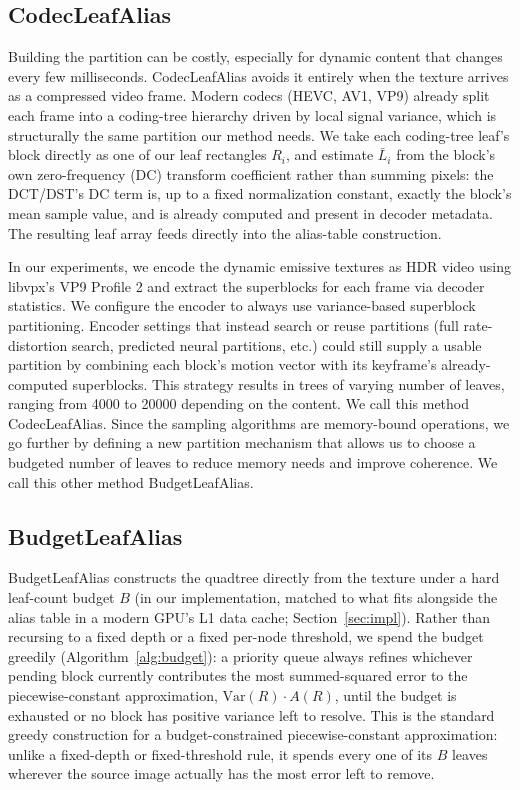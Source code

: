 \documentclass[acmtog,review,anonymous]{acmart}
\begin{document}
\subsection{CodecLeafAlias}
\label{sec:codec}
Building the partition can be costly, especially for dynamic content that changes every few milliseconds. 
CodecLeafAlias avoids it entirely when the texture 
arrives as a compressed video frame. Modern codecs (HEVC, AV1, VP9) already split each frame
into a coding-tree hierarchy driven by local signal variance, which is structurally the same
partition our method needs.
We take each coding-tree leaf's block directly as one of our leaf rectangles $R_i$, and
estimate $\bar{L}_i$ from the block's own zero-frequency (DC) transform coefficient rather
than summing pixels: the DCT/DST's DC term is, up to a fixed normalization constant, exactly
the block's mean sample value, and is already computed and present in decoder metadata. 
The resulting leaf array feeds directly into the alias-table construction. 

In our experiments, we encode the dynamic emissive textures as HDR video using libvpx's VP9 Profile 2 and extract the superblocks for each frame via decoder statistics. We configure the encoder to always use variance-based superblock partitioning. Encoder settings that instead search or reuse partitions (full rate-distortion search, predicted neural partitions, etc.) could still supply a usable partition by combining each block's motion vector with its keyframe's already-computed superblocks. This strategy results in trees of varying number of leaves, ranging from 4000 to 20000 depending on the content. We call this method CodecLeafAlias. Since the sampling algorithms are memory-bound operations, we go further by defining a new partition mechanism that allows us to choose a budgeted number of leaves to reduce memory needs and improve coherence. We call this other method BudgetLeafAlias.

\subsection{BudgetLeafAlias}
\label{sec:budget}
BudgetLeafAlias constructs the quadtree directly from the texture under a hard
leaf-count budget $B$ (in our implementation, matched to what fits alongside the alias
table in a modern GPU's L1 data cache; Section~\ref{sec:impl}). Rather than recursing to a
fixed depth or a fixed per-node threshold, we spend the budget greedily
(Algorithm~\ref{alg:budget}): a priority queue always refines whichever pending block
currently contributes the most summed-squared error to the piecewise-constant
approximation, $\mathrm{Var}(R)\cdot A(R)$, until the budget is exhausted or no block has
positive variance left to resolve. This is the standard greedy construction for a
budget-constrained piecewise-constant approximation: unlike a fixed-depth or
fixed-threshold rule, it spends every one of its $B$ leaves wherever the source image
actually has the most error left to remove.
\end{document}
